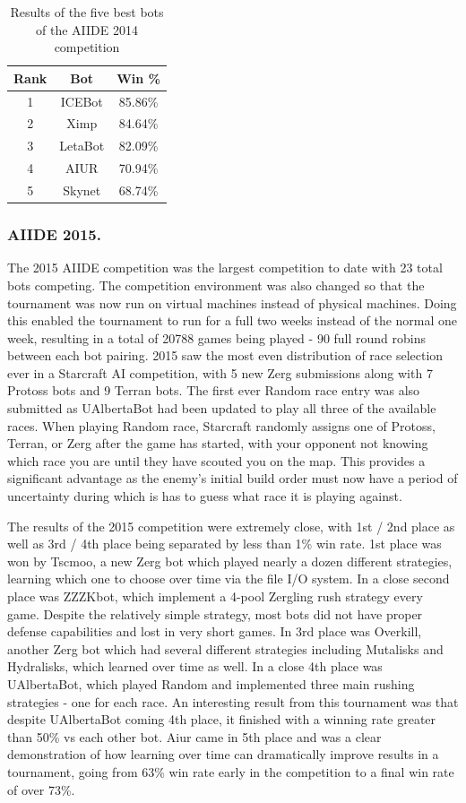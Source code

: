 \documentclass{llncs}
\begin{document}
\begin{table}[!t]
\caption{Results of the five best bots of the AIIDE 2014 competition}
\label{tab:aiide2014}
\centering
\begin{tabular}{|c|c|c|}
\hline
{\bfseries Rank} & {\bfseries Bot} & {\bfseries Win \%} \\
\hline
1 & ICEBot & 85.86\% \\
2 & Ximp & 84.64\% \\
3 & LetaBot & 82.09\% \\
4 & AIUR & 70.94\% \\
5 & Skynet & 68.74\% \\
\hline
\end{tabular}
\end{table}

\subsubsection{AIIDE 2015.}

The 2015 AIIDE competition was the largest competition to date with 23 total bots competing. The competition environment was also changed so that the tournament was now run on virtual machines instead of physical machines. Doing this enabled the tournament to run for a full two weeks instead of the normal one week, resulting in a total of 20788 games being played - 90 full round robins between each bot pairing. 2015 saw the most even distribution of race selection ever in a Starcraft AI competition, with 5 new Zerg submissions along with 7 Protoss bots and 9 Terran bots. The first ever Random race entry was also submitted as UAlbertaBot had been updated to play all three of the available races. When playing Random race, Starcraft randomly assigns one of Protoss, Terran, or Zerg after the game has started, with your opponent not knowing which race you are until they have scouted you on the map. This provides a significant advantage as the enemy's initial build order must now have a period of uncertainty during which is has to guess what race it is playing against.

The results of the 2015 competition were extremely close, with 1st / 2nd place as well as 3rd / 4th place being separated by less than 1\% win rate. 1st place was won by Tscmoo, a new Zerg bot which played nearly a dozen different strategies, learning which one to choose over time via the file I/O system. In a close second place was ZZZKbot, which implement a 4-pool Zergling rush strategy every game. Despite the relatively simple strategy, most bots did not have proper defense capabilities and lost in very short games. In 3rd place was Overkill, another Zerg bot which had several different strategies including Mutalisks and Hydralisks, which learned over time as well. In a close 4th place was UAlbertaBot, which played Random and implemented three main rushing strategies - one for each race. An interesting result from this tournament was that despite UAlbertaBot coming 4th place, it finished with a winning rate greater than 50\% vs each other bot. Aiur came in 5th place and was a clear demonstration of how learning over time can dramatically improve results in a tournament, going from 63\% win rate early in the competition to a final win rate of over 73\%.
\end{document}
